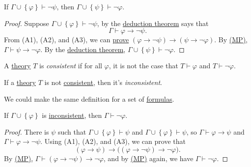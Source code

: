 \begin{proposition}[Contraposition]\label{prop:contraposition}
	If \(\Gamma \cup \left\{ \varphi  \right\} \vdash \lnot \psi \), then \(\Gamma \cup \left\{ \psi  \right\} \vdash \lnot \varphi \).
\end{proposition}
\begin{proof}
	Suppose \(\Gamma \cup \left\{ \varphi  \right\} \vdash \lnot \psi \), by the \hyperref[thm:deduction]{deduction theorem} says that
	\[
		\Gamma \vdash \varphi \to \lnot \psi .
	\]
	From (A1), (A2), and (A3), we can \hyperref[def:proof]{prove} \((\varphi \to \lnot \psi ) \to (\psi \to \lnot \varphi )\). By \hyperref[def:rule-of-inference]{(MP)}, \(\Gamma \vdash \psi \to \lnot \varphi \). By the \hyperref[thm:deduction]{deduction theorem}, \(\Gamma \cup \left\{ \psi  \right\} \vdash \lnot \varphi \).
\end{proof}

\begin{definition}[Consistent]\label{def:consistent}
	A \hyperref[def:theory]{theory} \(T\) is \emph{consistent} if for all \(\varphi \), it is not the case that \(T \vdash \varphi \) and \(T \vdash \lnot \varphi \).
\end{definition}

\begin{definition}[Inconsistent]\label{def:inconsistent}
	If a \hyperref[def:theory]{theory} \(T\) is not \hyperref[def:consistent]{consistent}, then it's \emph{inconsistent}.
\end{definition}

\begin{remark}
	We could make the same definition for a set of \hyperref[def:formula]{formulas}.
\end{remark}

\begin{proposition}\label{prop:proof-by-contradiction}
	If \(\Gamma \cup \left\{ \varphi \right\}\) is \hyperref[def:inconsistent]{inconsistent}, then \(\Gamma \vdash \lnot \varphi \).
\end{proposition}
\begin{proof}
	There is \(\psi \) 	such that \(\Gamma \cup \left\{ \varphi  \right\} \vdash \psi \) and \(\Gamma \cup \left\{ \varphi  \right\} \vdash \psi \), so \(\Gamma \vdash \varphi \to \psi \) and \(\Gamma \vdash \varphi \to \lnot \psi \). Using (A1), (A2), and (A3), we can prove that
	\[
		(\varphi \to \psi ) \to \big( (\varphi \to \lnot \psi ) \to \lnot \varphi \big).
	\]
	By \hyperref[def:rule-of-inference]{(MP)}, \(\Gamma \vdash (\varphi \to \lnot \psi ) \to \lnot \varphi \), and by \hyperref[def:rule-of-inference]{(MP)} again, we have \(\Gamma \vdash \lnot \varphi \).
\end{proof}

